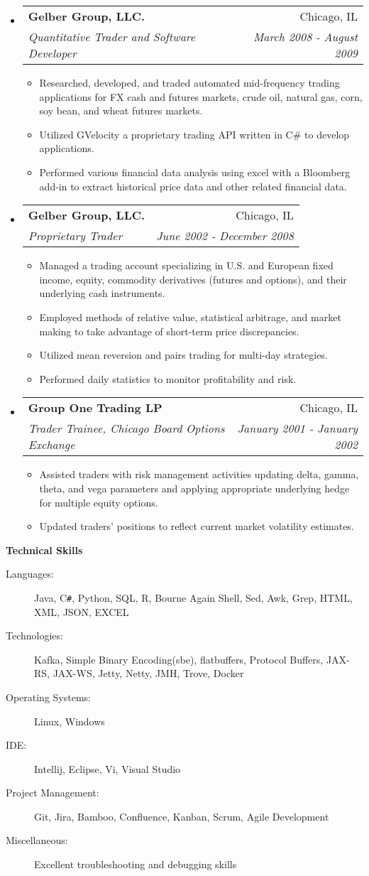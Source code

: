 \documentclass[letterpaper,11pt]{article}
\makeatletter
\newcommand{\resitem}[1]{\item #1 \vspace{-2pt}}
\newcommand{\resheading}[1]{{\large \colorbox{mygrey}{\begin{minipage}{\textwidth}{\textbf{#1 \vphantom{p\^{E}}}}\end{minipage}}}}
\newcommand{\ressubheading}[4]{
\begin{tabular*}{7.0in}{l@{\extracolsep{\fill}}r}
		\textbf{#1} & #2 \\
		\textit{#3} & \textit{#4} \\
\end{tabular*}\vspace{-6pt}}
\makeatother
\begin{document}
\begin{itemize}
\item
	\ressubheading{Gelber Group, LLC.}{Chicago, IL}{Quantitative Trader and Software Developer}{March 2008 - August 2009}
	\begin{itemize}
		\resitem{Researched, developed, and traded automated mid-frequency trading applications for FX cash and 
   futures markets, crude oil, natural gas, corn, soy bean, and wheat futures markets.}
		\resitem{Utilized GVelocity a proprietary trading API written in C\# to develop applications.}
		\resitem{Performed various financial data analysis using excel with a Bloomberg add-in to extract historical price data and other related financial data.}
	\end{itemize}

\item
	\ressubheading{Gelber Group, LLC.}{Chicago, IL}{Proprietary Trader}{June 2002 - December 2008}
	\begin{itemize}
		\resitem{Managed a trading account specializing in U.S. and European fixed income, equity, commodity
   derivatives (futures and options), and their underlying cash instruments.}
		\resitem{Employed methods of relative value, statistical arbitrage, and market making to take advantage 
   of short-term price discrepancies.}
		\resitem{Utilized mean reversion and pairs trading for multi-day strategies.}
		\resitem{Performed daily statistics to monitor profitability and risk. }
	\end{itemize}

\item
	\ressubheading{Group One Trading LP}{Chicago, IL}{Trader Trainee, Chicago Board Options Exchange}{January 2001 - January 2002}
	\begin{itemize}
		\resitem{Assisted traders with risk management activities updating delta, gamma, theta, and vega
  parameters and applying appropriate underlying hedge for multiple equity options.}
		\resitem{Updated traders’ positions to reflect current market volatility estimates.}
	\end{itemize}

\end{itemize}

\resheading{Technical Skills}

\begin{description}
\item[Languages:]
Java, C{}\verb!#!, Python, SQL, R, Bourne Again Shell, Sed, Awk, Grep, HTML, XML, JSON, EXCEL
\item[Technologies:]
Kafka, Simple Binary Encoding(sbe), flatbuffers, Protocol Buffers, JAX-RS, JAX-WS, Jetty, Netty, JMH, Trove, Docker
\item[Operating Systems:]
Linux, Windows
\item[IDE:]
Intellij, Eclipse, Vi, Visual Studio
\item[Project Management:]
Git, Jira, Bamboo, Confluence, Kanban, Scrum, Agile Development
\item[Miscellaneous:]
Excellent troubleshooting and debugging skills
\end{description}


\end{document}
